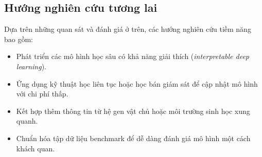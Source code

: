 \subsection{Hướng nghiên cứu tương lai}

Dựa trên những quan sát và đánh giá ở trên, các hướng nghiên cứu tiềm năng bao gồm:

\begin{itemize}
    \item Phát triển các mô hình học sâu có khả năng giải thích (\textit{interpretable deep learning}).
    \item Ứng dụng kỹ thuật học liên tục hoặc học bán giám sát để cập nhật mô hình với chi phí thấp.
    \item Kết hợp thêm thông tin từ hệ gen vật chủ hoặc môi trường sinh học xung quanh.
    \item Chuẩn hóa tập dữ liệu benchmark để dễ dàng đánh giá mô hình một cách khách quan.
\end{itemize}